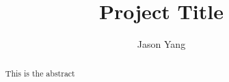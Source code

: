 \title{Project Title}
\author{Jason Yang}
\maketitle

\begin{abstract}
	This is the abstract
\end{abstract}